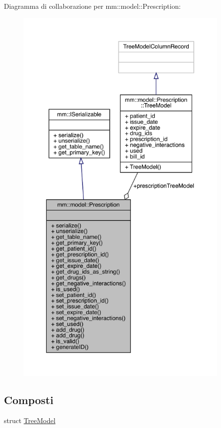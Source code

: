 Diagramma di collaborazione per mm\+:\+:model\+:\+:Prescription\+:
\nopagebreak
\begin{figure}[H]
\begin{center}
\leavevmode
\includegraphics[height=550pt]{da/d04/classmm_1_1model_1_1_prescription__coll__graph}
\end{center}
\end{figure}
\subsection*{Composti}
\begin{DoxyCompactItemize}
\item 
struct \mbox{\hyperlink{structmm_1_1model_1_1_prescription_1_1_tree_model}{Tree\+Model}}
\end{DoxyCompactItemize}
